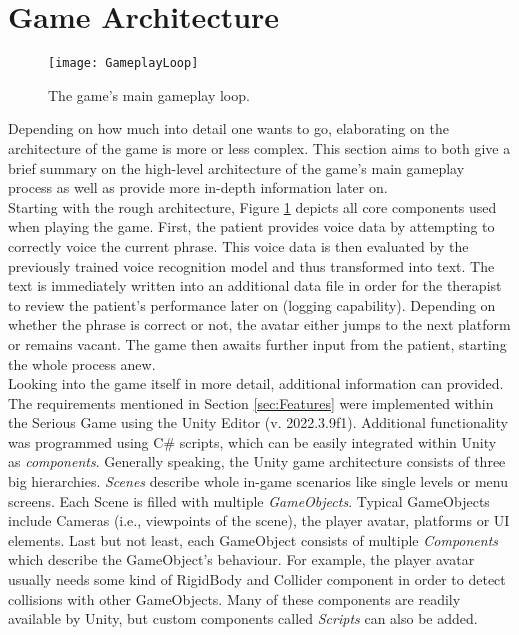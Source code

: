 \documentclass[draft,final]{vutinfth} %
\begin{document}
\section{Game Architecture}
\begin{figure}
  \centering
  \texttt{[image: GameplayLoop]}
  \caption{The game's main gameplay loop.}
  \label{fig:architecture}
\end{figure}
Depending on how much into detail one wants to go, elaborating on the architecture of the game is more or less complex. This section aims to both give a brief summary on the high-level architecture of the game's main gameplay process as well as provide more in-depth information later on. \\
Starting with the rough architecture, Figure \ref{fig:architecture} depicts all core components used when playing the game. First, the patient provides voice data by attempting to correctly voice the current phrase. This voice data is then evaluated by the previously trained voice recognition model and thus transformed into text. The text is immediately written into an additional data file in order for the therapist to review the patient's performance later on (logging capability). Depending on whether the phrase is correct or not, the avatar either jumps to the next platform or remains vacant. The game then awaits further input from the patient, starting the whole process anew. \\


Looking into the game itself in more detail, additional information can provided. The requirements mentioned in Section \ref{sec:Features} were implemented within the Serious Game using the Unity Editor (v. 2022.3.9f1). Additional functionality was programmed using C\# scripts, which can be easily integrated within Unity as \emph{components}. Generally speaking, the Unity game architecture consists of three big hierarchies. \emph{Scenes} describe whole in-game scenarios like single levels or menu screens. Each Scene is filled with multiple \emph{GameObjects}. Typical GameObjects include Cameras (i.e., viewpoints of the scene), the player avatar, platforms or UI elements. Last but not least, each GameObject consists of multiple \emph{Components} which describe the GameObject's behaviour. For example, the player avatar usually needs some kind of RigidBody and Collider component in order to detect collisions with other GameObjects. Many of these components are readily available by Unity, but custom components called \emph{Scripts} can also be added. \\
\end{document}
